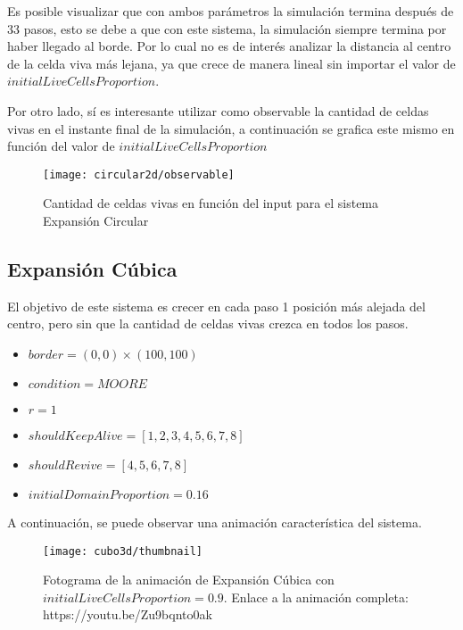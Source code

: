 Es posible visualizar que con ambos parámetros la simulación termina después de 33 pasos, esto se debe a que con este sistema, la simulación
siempre termina por haber llegado al borde. Por lo cual no es de interés analizar la distancia al centro de la celda viva más lejana, ya que
crece de manera lineal sin importar el valor de $initialLiveCellsProportion$.

Por otro lado, sí es interesante utilizar como observable la cantidad de celdas vivas en el instante final de la simulación, a continuación se
grafica este mismo en función del valor de $initialLiveCellsProportion$


\begin{figure}[H]
    \centering
    \texttt{[image: circular2d/observable]}
    \caption{Cantidad de celdas vivas en función del input para el sistema Expansión Circular}
    \label{fig:circular2d_observable}
\end{figure}


\subsection{Expansión Cúbica}\label{subsec:cubito-3D}

El objetivo de este sistema es crecer en cada paso 1 posición más alejada del centro, pero sin que la cantidad de celdas vivas crezca en todos los pasos.

\begin{itemize}
    \item $border = (0, 0) \times (100, 100)$
    \item $condition = MOORE$
    \item $r = 1$
    \item $shouldKeepAlive = [1, 2, 3, 4, 5, 6, 7, 8]$
    \item $shouldRevive = [4, 5, 6, 7, 8]$
    \item $initialDomainProportion = 0.16$
\end{itemize}


A continuación, se puede observar una animación característica del sistema.

\begin{figure}[H]
    \centering
    \texttt{[image: cubo3d/thumbnail]}
    \caption{Fotograma de la animación de Expansión Cúbica con $initialLiveCellsProportion = 0.9$. Enlace a la animación completa: https://youtu.be/Zu9bqnto0ak}
    \label{fig:thumbnailcubo3d_i90}
\end{figure}

